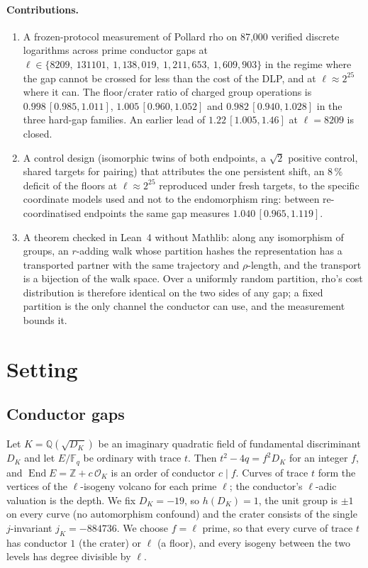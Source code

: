 \documentclass[10pt,a4paper]{article}
\newcommand{\FF}{\mathbb{F}}
\newcommand{\ZZ}{\mathbb{Z}}
\newcommand{\OK}{\mathcal{O}_K}
\newcommand{\End}{\operatorname{End}}
\theoremstyle{remark}
\begin{document}
\paragraph{Contributions.}
\begin{enumerate}
\item A frozen-protocol measurement of Pollard rho on 87{,}000 verified
      discrete logarithms across prime conductor gaps at
      $\ell \in \{8209,\ 131101,\ 1{,}138{,}019,\ 1{,}211{,}653,\
      1{,}609{,}903\}$ in the regime where the gap cannot be crossed for
      less than the cost of the DLP, and at $\ell \approx 2^{25}$ where it
      can. The floor/crater ratio of charged group operations is
      $0.998\,[0.985, 1.011]$, $1.005\,[0.960, 1.052]$ and
      $0.982\,[0.940, 1.028]$ in the three hard-gap families. An earlier
      lead of $1.22\,[1.005, 1.46]$ at $\ell = 8209$ is closed.
\item A control design (isomorphic twins of both endpoints, a $\sqrt2$
      positive control, shared targets for pairing) that attributes the one
      persistent shift, an $8\,\%$ deficit of the floors at
      $\ell \approx 2^{25}$ reproduced under fresh targets, to the specific
      coordinate models used and not to the endomorphism ring: between
      re-coordinatised endpoints the same gap measures $1.040\,[0.965, 1.119]$.
\item A theorem checked in Lean~4 without Mathlib: along any isomorphism
      of groups, an $r$-adding walk whose partition hashes the representation
      has a transported partner with the same trajectory and $\rho$-length,
      and the transport is a bijection of the walk space. Over a uniformly
      random partition, rho's cost distribution is therefore identical on
      the two sides of any gap; a fixed partition is the only channel the
      conductor can use, and the measurement bounds it.
\end{enumerate}

\section{Setting}

\subsection{Conductor gaps}

Let $K = \mathbb{Q}(\sqrt{D_K})$ be an imaginary quadratic field of
fundamental discriminant $D_K$ and let $E/\FF_q$ be ordinary with trace
$t$. Then $t^2 - 4q = f^2 D_K$ for an integer $f$, and
$\End E = \ZZ + c\,\OK$ is an order of conductor $c \mid f$. Curves of
trace $t$ form the vertices of the $\ell$-isogeny volcano for each prime
$\ell$; the conductor's $\ell$-adic valuation is the depth. We fix
$D_K = -19$, so $h(D_K) = 1$, the unit group is $\pm 1$ on every curve
(no automorphism confound) and the crater consists of the single
$j$-invariant $j_K = -884736$. We choose $f = \ell$ prime, so that every
curve of trace $t$ has conductor $1$ (the crater) or $\ell$ (a floor), and
every isogeny between the two levels has degree divisible by $\ell$.
\end{document}

